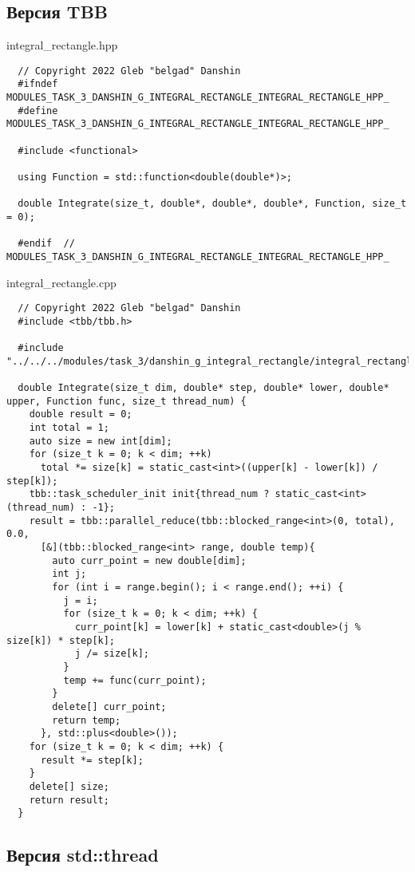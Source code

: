 \documentclass{report}
\begin{document}
\subsection*{Версия TBB}

integral\_rectangle.hpp
\begin{lstlisting}
  // Copyright 2022 Gleb "belgad" Danshin
  #ifndef MODULES_TASK_3_DANSHIN_G_INTEGRAL_RECTANGLE_INTEGRAL_RECTANGLE_HPP_
  #define MODULES_TASK_3_DANSHIN_G_INTEGRAL_RECTANGLE_INTEGRAL_RECTANGLE_HPP_
  
  #include <functional>
  
  using Function = std::function<double(double*)>;
  
  double Integrate(size_t, double*, double*, double*, Function, size_t = 0);
  
  #endif  // MODULES_TASK_3_DANSHIN_G_INTEGRAL_RECTANGLE_INTEGRAL_RECTANGLE_HPP_
\end{lstlisting}

integral\_rectangle.cpp
\begin{lstlisting}
  // Copyright 2022 Gleb "belgad" Danshin
  #include <tbb/tbb.h>
  
  #include "../../../modules/task_3/danshin_g_integral_rectangle/integral_rectangle.hpp"
  
  double Integrate(size_t dim, double* step, double* lower, double* upper, Function func, size_t thread_num) {
    double result = 0;
    int total = 1;
    auto size = new int[dim];
    for (size_t k = 0; k < dim; ++k)
      total *= size[k] = static_cast<int>((upper[k] - lower[k]) / step[k]);
    tbb::task_scheduler_init init{thread_num ? static_cast<int>(thread_num) : -1};
    result = tbb::parallel_reduce(tbb::blocked_range<int>(0, total), 0.0,
      [&](tbb::blocked_range<int> range, double temp){
        auto curr_point = new double[dim];
        int j;
        for (int i = range.begin(); i < range.end(); ++i) {
          j = i;
          for (size_t k = 0; k < dim; ++k) {
            curr_point[k] = lower[k] + static_cast<double>(j % size[k]) * step[k];
            j /= size[k];
          }
          temp += func(curr_point);
        }
        delete[] curr_point;
        return temp;
      }, std::plus<double>());
    for (size_t k = 0; k < dim; ++k) {
      result *= step[k];
    }
    delete[] size;
    return result;
  }
\end{lstlisting}

\subsection*{Версия std::thread}
\end{document}
